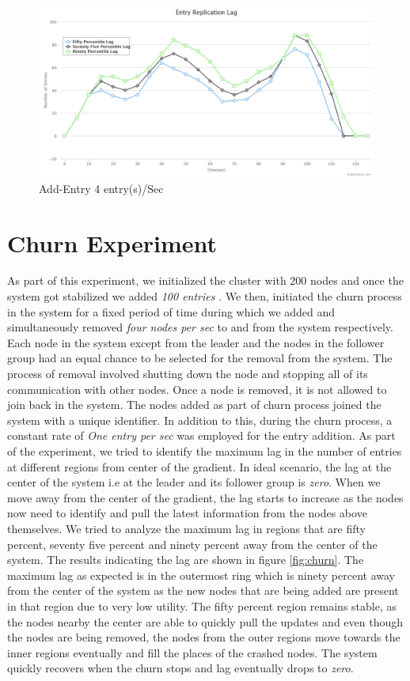\documentclass[a4paper,11pt]{kth-mag}
\begin{document}
\begin{figure}[h]
	\includegraphics[scale=0.2]{Add200-4EntryPerSec}
	\caption{Add-Entry 4 entry(s)/Sec}
	\label{fig:addEntry4}
\end{figure}

\section{Churn Experiment}
\label{sec:churn}
As part of this experiment, we initialized the cluster with 200 nodes and once the system got stabilized we added \textit{100 entries} . We then, initiated the churn process in the system for a fixed period of time during which we added and simultaneously removed \textit{four nodes per sec} to and from the system respectively. Each node in the system except from the leader and the nodes in the follower group had an equal chance to be selected for the removal from the system. The process of removal involved shutting down the node and stopping all of its communication with other nodes. Once a node is removed, it is not allowed to join back in the system. The nodes added as part of churn process joined the system with a unique identifier. In addition to this, during the churn process, a constant rate of \textit{ One entry per sec} was employed for the entry addition. As part of the experiment, we tried to identify the maximum lag in the number of entries at different regions from center of the gradient. In ideal scenario, the lag at the center of the system i.e at the leader and its follower group is \textit{zero}. When we move away from the center of the gradient, the lag starts to increase as the nodes now need to identify and pull the latest information from the nodes above themselves. We tried to analyze the maximum lag in regions that are fifty percent, seventy five percent and ninety percent away from the center of the system. The results indicating the lag are shown in figure \ref{fig:churn}. The maximum lag as expected is in the outermost ring which is ninety percent away from the center of the system as the new nodes that are being added are present in that region due to very low utility. The fifty percent region remains stable, as the nodes nearby the center are able to quickly pull the updates and even though the nodes are being removed, the nodes from the outer regions move towards the inner regions eventually and fill the places of the crashed nodes. The system quickly recovers when the churn stops and lag eventually drops to \textit{zero}.
\end{document}

